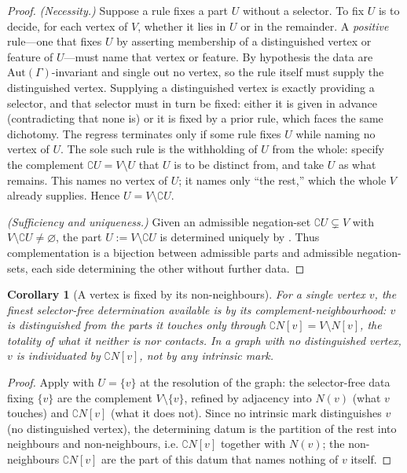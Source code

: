 \documentclass[11pt,a4paper]{article}
\theoremstyle{thmstyle}
\newtheorem{corollary}[theorem]{Corollary}
\theoremstyle{definition}
\theoremstyle{remark}
\newcommand{\Gph}{\Gamma}                 %
\newcommand{\V}{V}                        %
\newcommand{\Nbr}{N}                      %
\newcommand{\co}{\complement}             %
\begin{document}
\begin{proof}
\emph{(Necessity.)} Suppose a rule fixes a part $U$ without a selector. To fix
$U$ is to decide, for each vertex of $\V$, whether it lies in $U$ or in the
remainder. A \emph{positive} rule---one that fixes $U$ by asserting membership of
a distinguished vertex or feature of $U$---must name that vertex or feature. By
hypothesis the data are $\mathrm{Aut}(\Gph)$-invariant and single out no vertex,
so the rule itself must supply the distinguished vertex. Supplying a
distinguished vertex is exactly providing a selector, and that selector must in
turn be fixed: either it is given in advance (contradicting that none is) or it
is fixed by a prior rule, which faces the same dichotomy. The regress terminates
only if some rule fixes $U$ while naming no vertex of $U$. The sole such rule is
the withholding of $U$ from the whole: specify the complement $\co U=\V\setminus
U$ that $U$ is to be distinct from, and take $U$ as what remains. This names no
vertex of $U$; it names only ``the rest,'' which the whole $\V$ already
supplies. Hence $U=\V\setminus\co U$.

\emph{(Sufficiency and uniqueness.)} Given an admissible negation-set
$\co U\subsetneq\V$ with $\V\setminus\co U\neq\varnothing$, the part
$U:=\V\setminus\co U$ is determined uniquely by . Thus
complementation is a bijection between admissible parts and admissible
negation-sets, each side determining the other without further data.
\end{proof}

\begin{corollary}[A vertex is fixed by its non-neighbours]
\label{cor:vertex-negation}
For a single vertex $v$, the finest selector-free determination available is by
its complement-neighbourhood: $v$ is distinguished from the parts it touches
only through $\co\Nbr[v]=\V\setminus\Nbr[v]$, the totality of what it neither is
nor contacts. In a graph with no distinguished vertex, $v$ is individuated by
$\co\Nbr[v]$, not by any intrinsic mark.
\end{corollary}

\begin{proof}
Apply  with $U=\{v\}$ at the resolution of the graph: the
selector-free data fixing $\{v\}$ are the complement
$\V\setminus\{v\}$, refined by adjacency into $\Nbr(v)$ (what $v$ touches) and
$\co\Nbr[v]$ (what it does not). Since no intrinsic mark distinguishes $v$
(no distinguished vertex), the determining datum is the partition of the rest
into neighbours and non-neighbours, i.e. $\co\Nbr[v]$ together with $\Nbr(v)$;
the non-neighbours $\co\Nbr[v]$ are the part of this datum that names nothing of
$v$ itself.
\end{proof}
\end{document}
